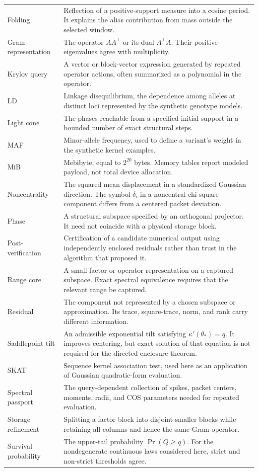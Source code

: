\begin{longtable}{@{}P{.25\linewidth}P{.70\linewidth}@{}}
Folding & Reflection of a positive-support measure into a cosine period. It explains the alias contribution from mass outside the selected window.\\
Gram representation & The operator $AA^\top$ or its dual $A^\top A$. Their positive eigenvalues agree with multiplicity.\\
Krylov query & A vector or block-vector expression generated by repeated operator actions, often summarized as a polynomial in the operator.\\
LD & Linkage disequilibrium, the dependence among alleles at distinct loci represented by the synthetic genotype models.\\
Light cone & The phases reachable from a specified initial support in a bounded number of exact structural steps.\\
MAF & Minor-allele frequency, used to define a variant's weight in the synthetic kernel examples.\\
MiB & Mebibyte, equal to $2^{20}$ bytes. Memory tables report modeled payload, not total device allocation.\\
Noncentrality & The squared mean displacement in a standardized Gaussian direction. The symbol $\delta_i$ in a noncentral chi-square component differs from a centered packet deviation.\\
Phase & A structural subspace specified by an orthogonal projector. It need not coincide with a physical storage block.\\
Post-verification & Certification of a candidate numerical output using independently enclosed residuals rather than trust in the algorithm that proposed it.\\
Range core & A small factor or operator representation on a captured subspace. Exact spectral equivalence requires that the relevant range be captured.\\
Residual & The component not represented by a chosen subspace or approximation. Its trace, square-trace, norm, and rank carry different information.\\
Saddlepoint tilt & An admissible exponential tilt satisfying $\kappa'(\theta_*)=q$. It improves centering, but exact solution of that equation is not required for the directed enclosure theorem.\\
SKAT & Sequence kernel association test, used here as an application of Gaussian quadratic-form evaluation.\\
Spectral passport & The query-dependent collection of spikes, packet centers, moments, radii, and COS parameters needed for repeated evaluation.\\
Storage refinement & Splitting a factor block into disjoint smaller blocks while retaining all columns and hence the same Gram operator.\\
Survival probability & The upper-tail probability $\Pr(Q\ge q)$. For the nondegenerate continuous laws considered here, strict and non-strict thresholds agree.\\
\bottomrule
\end{longtable}

